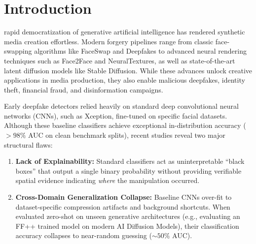 \documentclass[10pt,conference]{IEEEtran}
\begin{document}
\section{Introduction}\label{sec:intro}
 rapid democratization of generative artificial intelligence has rendered synthetic media creation effortless. Modern forgery pipelines range from classic face-swapping algorithms like FaceSwap and Deepfakes to advanced neural rendering techniques such as Face2Face and NeuralTextures, as well as state-of-the-art latent diffusion models like Stable Diffusion. While these advances unlock creative applications in media production, they also enable malicious deepfakes, identity theft, financial fraud, and disinformation campaigns.

Early deepfake detectors relied heavily on standard deep convolutional neural networks (CNNs), such as Xception, fine-tuned on specific facial datasets. Although these baseline classifiers achieve exceptional in-distribution accuracy ($>98\%$ AUC on clean benchmark splits), recent studies reveal two major structural flaws:
\begin{enumerate}
    \item \textbf{Lack of Explainability:} Standard classifiers act as uninterpretable ``black boxes'' that output a single binary probability without providing verifiable spatial evidence indicating \emph{where} the manipulation occurred.
    \item \textbf{Cross-Domain Generalization Collapse:} Baseline CNNs over-fit to dataset-specific compression artifacts and background shortcuts. When evaluated zero-shot on unseen generative architectures (e.g., evaluating an FF++ trained model on modern AI Diffusion Models), their classification accuracy collapses to near-random guessing ($\sim 50\%$ AUC).
\end{enumerate}
\end{document}
